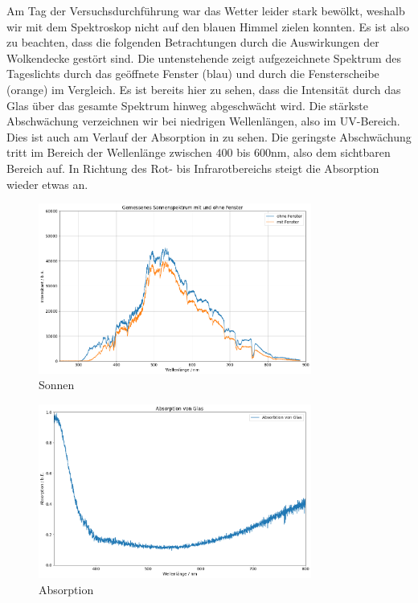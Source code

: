Am Tag der Versuchsdurchführung war das Wetter leider stark bewölkt, weshalb wir mit dem Spektroskop nicht auf den blauen Himmel zielen konnten. Es ist also zu beachten, dass die folgenden Betrachtungen durch die Auswirkungen der Wolkendecke gestört sind. Die untenstehende  zeigt aufgezeichnete Spektrum des Tageslichts durch das geöffnete Fenster (blau) und durch die Fensterscheibe (orange) im Vergleich. Es ist bereits hier zu sehen, dass die Intensität durch das Glas über das gesamte Spektrum hinweg abgeschwächt wird. Die stärkste Abschwächung verzeichnen wir bei niedrigen Wellenlängen, also im UV-Bereich. Dies ist auch am Verlauf der Absorption in  zu sehen. Die geringste Abschwächung tritt im Bereich der Wellenlänge zwischen $400$ bis $600\si{\nano\meter}$, also dem sichtbaren Bereich auf. In Richtung des Rot- bis Infrarotbereichs steigt die Absorption wieder etwas an.

\begin{figure}[H]
  \centering
  \includegraphics[width=0.8\textwidth]{files/plots/himmel_m_o_g.png}
  \caption{Sonnen}
  \label{fig:himmel_m_o_g}
\end{figure}

\begin{figure}[H]
  \centering
  \includegraphics[width=0.8\textwidth]{files/plots/absorption_glas.png}
  \caption{Absorption}
  \label{fig:absorption_glas}
\end{figure}

